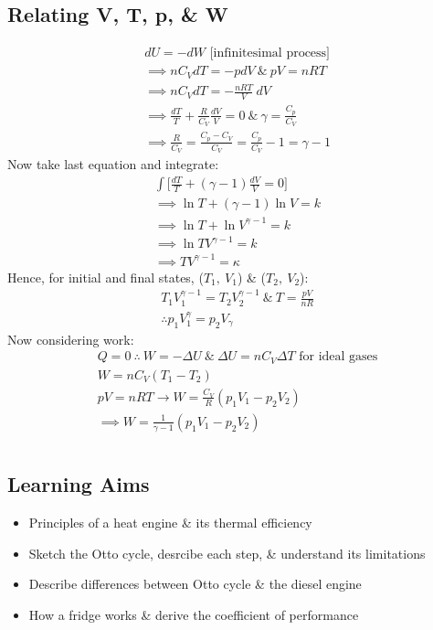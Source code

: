 \documentclass[a4paper, 11pt, fleqn, normalem]{report}
\begin{document}
\section*{Relating V, T, p, \& W}
\vspace{-24pt}
\begin{gather*}
	dU = -dW \text{ [infinitesimal process]} \\
	\implies nC_{V}dT = -pdV ~\&~ pV = nRT \\
	\implies nC_{V}dT = -\frac{nRT}{V}\:dV \\
	\implies \frac{dT}{T} + \frac{R}{C_{V}}\frac{dV}{V} = 0 ~\&~ \gamma = \frac{C_{p}}{C_{V}} \\
	\implies \frac{R}{C_{V}} = \frac{C_{p} - C_{V}}{C_{V}} = \frac{C_{p}}{C_{V}} - 1 = \gamma - 1
\end{gather*}
Now take last equation and integrate:
\begin{gather*}
	\int \bigg[\frac{dT}{T} + (\gamma - 1)\frac{dV}{V} = 0\bigg] \\
	\implies \ln{T} + (\gamma - 1)\ln{V} = k \\
	\implies \ln{T} + \ln{V^{\gamma - 1}} = k \\
	\implies \ln{TV^{\gamma - 1}} = k \\
	\implies TV^{\gamma - 1} = \kappa
\end{gather*}
Hence, for initial and final states, ($T_{1},\:V_{1}$) \& ($T_{2},\:V_{2}$):
\begin{gather*}
	T_{1}V_{1}^{\gamma - 1} = T_{2}V_{2}^{\gamma - 1} ~\&~ T = \frac{pV}{nR} \\
	\therefore p_{1}V_{1}^{\gamma} = p_{2}V_{\gamma}
\end{gather*}
Now considering work:
\begin{gather*}
	Q = 0 ~\therefore~ W = -{\Delta}U ~\&~ {\Delta}U = nC_{V}{\Delta}T \text{ for ideal gases} \\
	W = nC_{V}(T_{1} - T_{2}) \\
	pV = nRT \rightarrow W = \frac{C_{V}}{R}(p_{1}V_{1} - p_{2}V_{2}) \\
	\implies W = \frac{1}{\gamma - 1}(p_{1}V_{1} - p_{2}V_{2})
\end{gather*}

\chapter{}
\section*{Learning Aims}
\begin{itemize}
	\item Principles of a heat engine \& its thermal efficiency
	\item Sketch the Otto cycle, desrcibe each step, \& understand its limitations
	\item Describe differences between Otto cycle \& the diesel engine
	\item How a fridge works \& derive the coefficient of performance
\end{itemize}
\end{document}
